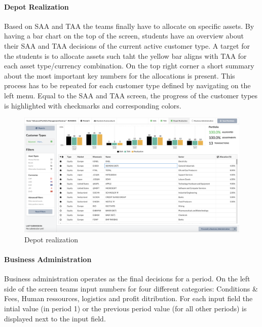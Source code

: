 \paragraph{Depot Realization}
Based on SAA and TAA the teams finally have to allocate on specific assets. By having a bar chart on the top of the screen, students have an overview about their SAA and TAA decisions of the current active customer type. A target for the students is to allocate assets such taht the yellow bar aligns with TAA for each asset type/currency combination. On the top right corner a short summary about the most important key numbers for the allocations is present.
This process has to be repeated for each customer type defined by navigating on the left menu. Equal to the SAA and TAA screen, the progress of the customer types is highlighted with checkmarks and corresponding colors.

\begin{figure}[h!]
  \centering
  \includegraphics[scale=0.2]{img/application-overview/teams/05_depot_realization.png}
  \caption{Depot realization}
\end{figure}

\paragraph{Business Administration}
Business administration operates as the final decisions for a period. On the left side of the screen teams input numbers for four different categories: Conditions \& Fees, Human ressources, logistics and profit ditribution. For each input field the intial value (in period 1) or the previous period value (for all other periods) is displayed next to the input field.\\

